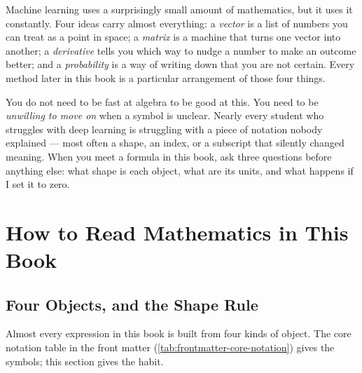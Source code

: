 \begin{plainlanguage}
Machine learning uses a surprisingly small amount of mathematics, but it uses
it constantly. Four ideas carry almost everything: a \emph{vector} is a list of
numbers you can treat as a point in space; a \emph{matrix} is a machine that
turns one vector into another; a \emph{derivative} tells you which way to nudge
a number to make an outcome better; and a \emph{probability} is a way of
writing down that you are not certain. Every method later in this book is a
particular arrangement of those four things.
\end{plainlanguage}

\begin{engineernote}
You do not need to be fast at algebra to be good at this. You need to be
\emph{unwilling to move on} when a symbol is unclear. Nearly every student who
struggles with deep learning is struggling with a piece of notation nobody
explained --- most often a shape, an index, or a subscript that silently
changed meaning. When you meet a formula in this book, ask three questions
before anything else: what shape is each object, what are its units, and what
happens if I set it to zero.
\end{engineernote}

\section{How to Read Mathematics in This Book}

\subsection{Four Objects, and the Shape Rule}

Almost every expression in this book is built from four kinds of object. The
core notation table in the front matter (\cref{tab:frontmatter-core-notation})
gives the symbols; this section gives the habit.

